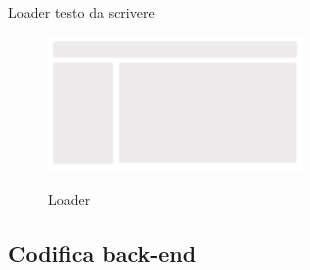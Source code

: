 Loader testo da scrivere

\begin{figure}[ht]
  \centering
  \includegraphics[width=0.6\textwidth, alt={Skeleton loader di caricamento principale dell'applicazione}]{images/frontend/Loader.jpg}
  \caption{Loader}\label{fig:loader}
\end{figure}




\subsection{Codifica back-end}\label{subsec:codifica-back-end}



